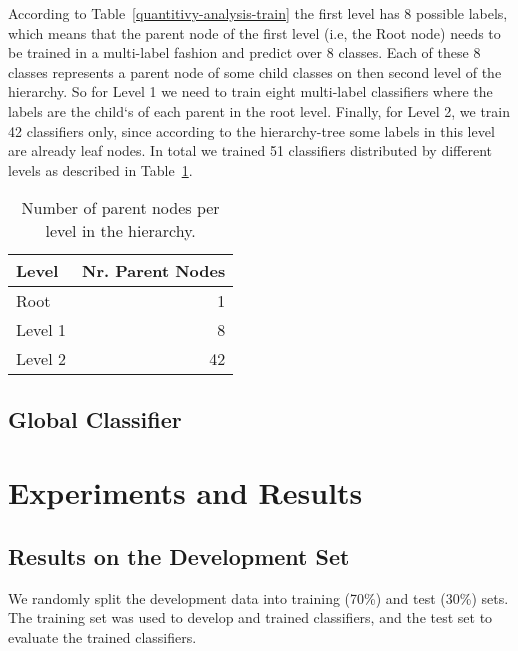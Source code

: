 \documentclass[11pt,a4paper]{article}
\begin{document}
According to Table~\ref{quantitivy-analysis-train} the first level has 8 possible
labels, which means that the parent node of the first level (i.e, the Root node)
needs to be trained in a multi-label fashion and predict over 8 classes. Each of
these 8 classes represents a parent node of some child classes on then
second level of the hierarchy. So for Level 1 we need to train eight multi-label
classifiers where the labels are the child`s of each parent in the root level.
Finally, for Level 2, we train 42 classifiers only, since according to the
hierarchy-tree some labels in this level are already leaf nodes. In total we
trained 51 classifiers distributed by different levels as described in
Table~\ref{parent-per-node-classifiers}.

\begin{table}[!h]
\small
\begin{center}
\begin{tabular}{|l|r|}
\hline\centering\textbf{Level}  &  \textbf{Nr. Parent Nodes}    \\
\hline
Root              &  1       \\
Level 1           &  8       \\
Level 2           &  42      \\
\hline
\end{tabular}
\end{center}
\caption{\label{parent-per-node-classifiers}Number of parent nodes per level in the hierarchy.}
\end{table}

\subsection{Global Classifier}



\section{Experiments and Results}\label{experiments}

\subsection{Results on the Development Set}

We randomly split the development data into training (70\%) and test (30\%) sets.
The training set was used to develop and trained classifiers, and the test set
to evaluate the trained classifiers.
\end{document}
